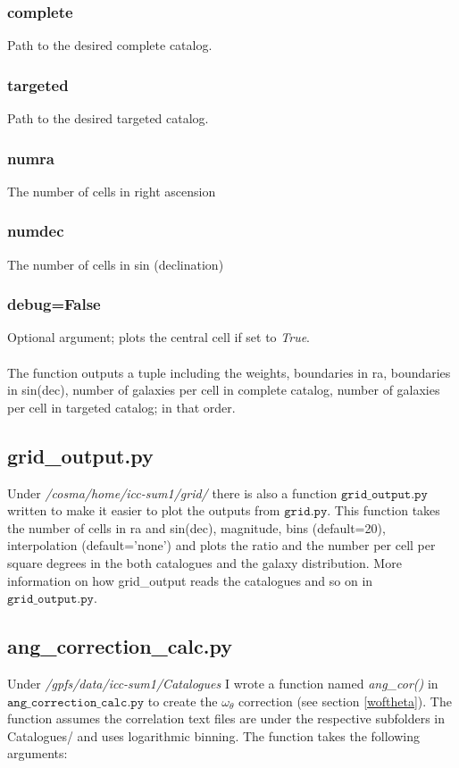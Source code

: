 \documentclass[12pt,helvetica,margin=2.5cm,a4paper,final]{iopart}
\begin{document}
\subsubsection{complete}
Path to the desired complete catalog.

\subsubsection{targeted}
Path to the desired targeted catalog.

\subsubsection{numra}
The number of cells in right ascension

\subsubsection{numdec}
The number of cells in sin (declination)

\subsubsection{debug=False}
Optional argument; plots the central cell if set to \emph{True}.

\paragraph{}
The function outputs a tuple including the weights, boundaries in ra, boundaries in sin(dec), number of galaxies per cell in complete catalog, number of galaxies per cell in targeted catalog; in that order.

\subsection{grid\_output.py}
Under \emph{/cosma/home/icc-sum1/grid/} there is also a function $\mathtt{grid\_output.py}$ written to make it easier to plot the outputs from $\mathtt{grid.py}$. This function takes the number of cells in ra and sin(dec), magnitude, bins (default=20), interpolation (default='none') and plots the ratio and the number per cell per square degrees in the both catalogues and the galaxy distribution. More information on how grid\_output reads the catalogues and so on in $\mathtt{grid\_output.py}$.

\subsection{ang\_correction\_calc.py}
Under \emph{/gpfs/data/icc-sum1/Catalogues} I wrote a function named \emph{ang\_cor()} in $\mathtt{ang\_correction\_calc.py}$ to create the $\omega_\theta$ correction (see section \ref{woftheta}). The function assumes the correlation text files are under the respective subfolders in Catalogues/ and uses logarithmic binning. The function takes the following arguments:
\end{document}
